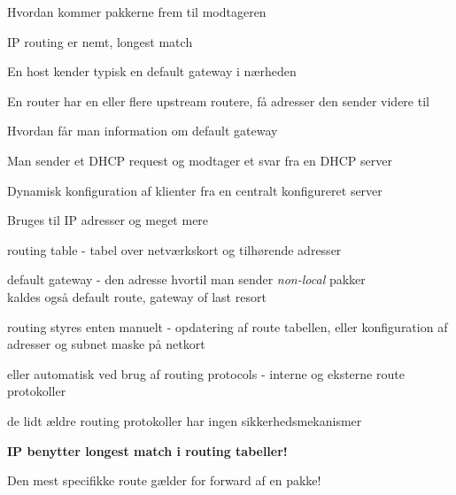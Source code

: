 \documentclass[Screen16to9,17pt]{foils}
\begin{document}
Hvordan kommer pakkerne frem til modtageren



\begin{list1}
\item IP routing er nemt, longest match
\item En host kender typisk en default gateway i nærheden
\item En router har en eller flere upstream routere, få adresser den sender videre til
\end{list1}



\begin{list1}
\item Hvordan får man information om default gateway
\item Man sender et DHCP request og modtager et svar fra en DHCP server
\item Dynamisk konfiguration af klienter fra en centralt konfigureret server
\item Bruges til IP adresser og meget mere
\end{list1}


\begin{list1}
  \item routing table - tabel over netværkskort og tilhørende adresser
\item default gateway - den adresse hvortil man sender
  \emph{non-local} pakker\\kaldes også default route, gateway of last
  resort
\item routing styres enten manuelt - opdatering af route tabellen,
  eller konfiguration af adresser og subnet maske på netkort
\item eller automatisk ved brug af routing protocols - interne og
  eksterne route protokoller
\item de lidt ældre routing protokoller har ingen sikkerhedsmekanismer
\item {\bf IP benytter longest match i routing tabeller!}
\item Den mest specifikke route gælder for forward af en pakke!
\end{list1}

\end{document}
